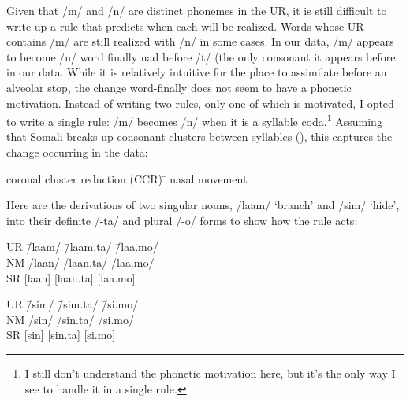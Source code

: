\documentclass[doc,12pt]{apa6}
\begin{document}
Given that /m/ and /n/ are distinct phonemes in the UR, it is still difficult
to write up a rule that predicts when each will be realized. Words whose UR
contains /m/ are still realized with /n/ in some cases.  In our data, /m/
appears to become /n/ word finally nad before /t/ (the only consonant it
appears before in our data. While it is relatively intuitive for the place to
assimilate before an alveolar stop, the change word-finally does not seem to
have a phonetic motivation. Instead of writing two rules, only one of which is
motivated, I opted to write a single rule: /m/ becomes /n/ when it is a
syllable coda.\footnote{I still don't understand the phonetic motivation here,
but it's the only way I see to handle it in a single rule.} Assuming that
Somali breaks up consonant clusters between syllables (), this
captures the change occurring in the data:

\begin{exe}
	\ex \begin{tabbing}
		coronal cluster reduction (CCR) \= \kill
		nasal movement \>
		\phonr{\phonfeat{+nas\\-syl}}{
	           \phonfeat{-lab\\+cor}}{
	           {]}_\sigma}
		\end{tabbing}
\end{exe}

Here are the derivations of two singular nouns, /laam/ `branch' and /sim/
`hide', into their definite /-ta/ and plural /-o/ forms to show how the rule
acts:

\begin{exe}
	\ex \begin{tabbing}
		UR \hspace{2em} \= /laam/ \= /laam.ta/ \= /laa.mo/ \\
		NM \> /laan/ \> /laan.ta/ \> /laa.mo/ \\
		SR \> {[}laan{]} \> {[}laan.ta{]} \> {[}laa.mo{]}
	    \end{tabbing}
	\ex \begin{tabbing}
		UR \hspace{2em} \= /sim/ \= /sim.ta/ \= /si.mo/ \\
		NM \> /sin/ \> /sin.ta/ \> /si.mo/ \\
		SR \> {[}sin{]} \> {[}sin.ta{]} \> {[}si.mo{]}
		\end{tabbing}
\end{exe}
\end{document}
